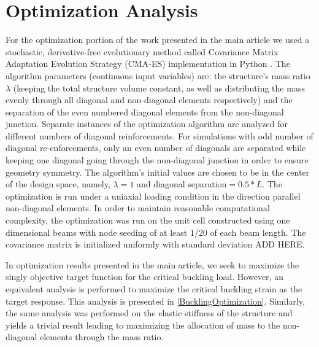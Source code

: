 \documentclass[10pt,twoside]{fernandes_supp}
\newcommand{\mf}[1]{\colorbox{blue!10}{\color{color3}#1}}
\begin{document}
\section{Optimization Analysis}
For the optimization portion of the work presented in the main article we used a stochastic, derivative-free evolutionary method called Covariance Matrix Adaptation Evolution Strategy (CMA-ES) implementation in Python \citep{hansen2003}. The algorithm parameters (continuous input variables) are: the structure's mass ratio $\lambda$ (keeping the total structure volume constant, as well as distributing the mass evenly through all diagonal and non-diagonal elements respectively) and the separation of the even numbered diagonal elements from the non-diagonal junction. Separate instances of the optimization algorithm are analyzed for different numbers of diagonal reinforcements. For simulations with odd number of diagonal re-enforcements, only an even number of diagonals are separated while keeping one diagonal going through the non-diagonal junction in order to ensure geometry symmetry. The algorithm's initial values are chosen to be in the center of the design space, namely, $\lambda=1$ and diagonal separation$=0.5*L$. The optimization is run under a uniaxial loading condition in the direction parallel non-diagonal elements. In order to maintain reasonable computational complexity, the optimization was run on the unit cell constructed using one dimensional beams with node seeding of at least 1/20 of each beam length. The covariance matrix is initialized uniformly with standard deviation \mf{ADD HERE}.

In optimization results presented in the main article, we seek to maximize the singly objective target function for the critical buckling load. However, an equivalent analysis is performed to maximize the critical buckling strain as the target response. This analysis is presented in \cref{BucklingOptimization}. Similarly, the same analysis was performed on the elastic stiffness of the structure and yields a trivial result leading to maximizing the allocation of mass to the non-diagonal elements through the mass ratio.
\end{document}
